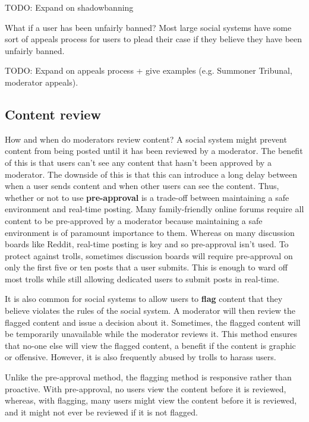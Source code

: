 \documentclass[class=book, crop=false]{standalone}
\providecommand{\keyterm}[1]{\textbf{#1}\marginnote{\scriptsize \textbf{#1}}}
\begin{document}
TODO: Expand on shadowbanning

What if a user has been unfairly banned? Most large social systems have some sort of appeals process for users to plead their case if they believe they have been unfairly banned.

TODO: Expand on appeals process + give examples (e.g. Summoner Tribunal, moderator appeals).

\subsection{Content review}

How and when do moderators review content? A social system might prevent content from being posted until it has been reviewed by a moderator. The benefit of this is that users can't see any content that hasn't been approved by a moderator. The downside of this is that this can introduce a long delay between when a user sends content and when other users can see the content. Thus, whether or not to use \keyterm{pre-approval} is a trade-off between maintaining a safe environment and real-time posting. Many family-friendly online forums require all content to be pre-approved by a moderator because maintaining a safe environment is of paramount importance to them. Whereas on many discussion boards like Reddit, real-time posting is key and so pre-approval isn't used. To protect against trolls, sometimes discussion boards will require pre-approval on only the first five or ten posts that a user submits. This is enough to ward off most trolls while still allowing dedicated users to submit posts in real-time.

It is also common for social systems to allow users to \keyterm{flag} content that they believe violates the rules of the social system. A moderator will then review the flagged content and issue a decision about it. Sometimes, the flagged content will be temporarily unavailable while the moderator reviews it. This method ensures that no-one else will view the flagged content, a benefit if the content is graphic or offensive. However, it is also frequently abused by trolls to harass users.

Unlike the pre-approval method, the flagging method is responsive rather than proactive. With pre-approval, no users view the content before it is reviewed, whereas, with flagging, many users might view the content before it is reviewed, and it might not ever be reviewed if it is not flagged.
\end{document}
